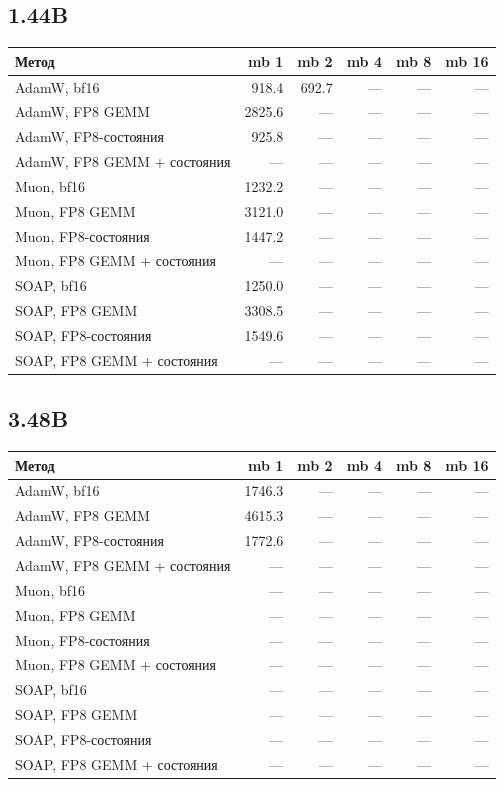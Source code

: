 \documentclass[10pt]{article}
\begin{document}
\subsection{1.44B}
\begin{center}
\small
\begin{tabular}{lrrrrr}
\toprule
\textbf{Метод} & \textbf{mb 1} & \textbf{mb 2} & \textbf{mb 4} & \textbf{mb 8} & \textbf{mb 16} \\
\midrule
AdamW, bf16 & 918.4 & 692.7 & --- & --- & --- \\
AdamW, FP8 GEMM & 2825.6 & --- & --- & --- & --- \\
AdamW, FP8-состояния & 925.8 & --- & --- & --- & --- \\
AdamW, FP8 GEMM + состояния & --- & --- & --- & --- & --- \\
Muon, bf16 & 1232.2 & --- & --- & --- & --- \\
Muon, FP8 GEMM & 3121.0 & --- & --- & --- & --- \\
Muon, FP8-состояния & 1447.2 & --- & --- & --- & --- \\
Muon, FP8 GEMM + состояния & --- & --- & --- & --- & --- \\
SOAP, bf16 & 1250.0 & --- & --- & --- & --- \\
SOAP, FP8 GEMM & 3308.5 & --- & --- & --- & --- \\
SOAP, FP8-состояния & 1549.6 & --- & --- & --- & --- \\
SOAP, FP8 GEMM + состояния & --- & --- & --- & --- & --- \\
\bottomrule
\end{tabular}
\end{center}
\subsection{3.48B}
\begin{center}
\small
\begin{tabular}{lrrrrr}
\toprule
\textbf{Метод} & \textbf{mb 1} & \textbf{mb 2} & \textbf{mb 4} & \textbf{mb 8} & \textbf{mb 16} \\
\midrule
AdamW, bf16 & 1746.3 & --- & --- & --- & --- \\
AdamW, FP8 GEMM & 4615.3 & --- & --- & --- & --- \\
AdamW, FP8-состояния & 1772.6 & --- & --- & --- & --- \\
AdamW, FP8 GEMM + состояния & --- & --- & --- & --- & --- \\
Muon, bf16 & --- & --- & --- & --- & --- \\
Muon, FP8 GEMM & --- & --- & --- & --- & --- \\
Muon, FP8-состояния & --- & --- & --- & --- & --- \\
Muon, FP8 GEMM + состояния & --- & --- & --- & --- & --- \\
SOAP, bf16 & --- & --- & --- & --- & --- \\
SOAP, FP8 GEMM & --- & --- & --- & --- & --- \\
SOAP, FP8-состояния & --- & --- & --- & --- & --- \\
SOAP, FP8 GEMM + состояния & --- & --- & --- & --- & --- \\
\bottomrule
\end{tabular}
\end{center}
\end{document}
